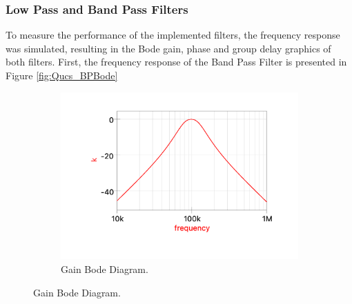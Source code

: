 \subsubsection{Low Pass and Band Pass Filters}

To measure the performance of the implemented filters, the frequency response was simulated, resulting in the Bode gain, phase and group delay graphics of both filters. First, the frequency response of the Band Pass Filter is presented in Figure \ref{fig:Qucs_BPBode}

\begin{figure}[H]
    \centering

    \begin{subfigure}[b]{0.5\textwidth}
        \centering
        \includegraphics[width=\textwidth]{Images/Qucs_BPgain.png}
        \caption{Gain Bode Diagram.}
        \label{fig:Qucs_BPgain}
    \end{subfigure}%


\end{figure}
